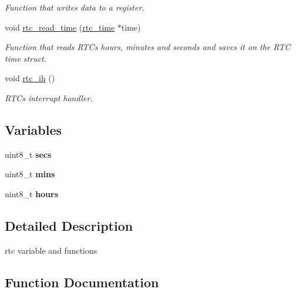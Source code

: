 \begin{DoxyCompactItemize}
\begin{DoxyCompactList}\small\item\em Function that writes data to a register. \end{DoxyCompactList}\item 
void \hyperlink{group__rtc_ga94747f0e2c4ea5ae327017d78a25de30}{rtc\+\_\+read\+\_\+time} (\hyperlink{structrtc__time}{rtc\+\_\+time} $\ast$time)
\begin{DoxyCompactList}\small\item\em Function that reads R\+TC\textquotesingle{}s hours, minutes and seconds and saves it on the R\+TC time struct. \end{DoxyCompactList}\item 
\mbox{\label{group__rtc_ga75dad42881d64cf07cf1bdc2979a7056}} 
void \hyperlink{group__rtc_ga75dad42881d64cf07cf1bdc2979a7056}{rtc\+\_\+ih} ()
\begin{DoxyCompactList}\small\item\em R\+TC\textquotesingle{}s interrupt handler. \end{DoxyCompactList}\end{DoxyCompactItemize}
\subsection*{Variables}
\begin{DoxyCompactItemize}
\item 
\mbox{\label{group__rtc_ga2593972e8de36f4c0ea51255e770b48b}} 
uint8\+\_\+t {\bfseries secs}
\item 
\mbox{\label{group__rtc_gaafb8fcb8e18658aceea7aa3dbf8a589e}} 
uint8\+\_\+t {\bfseries mins}
\item 
\mbox{\label{group__rtc_ga00a531a34a1d603329df5778f1203ab6}} 
uint8\+\_\+t {\bfseries hours}
\end{DoxyCompactItemize}


\subsection{Detailed Description}
rtc variable and functions 

\subsection{Function Documentation}
\mbox{\label{group__rtc_ga862729c9ed50edc422841b6b8bc5aa43}} 
